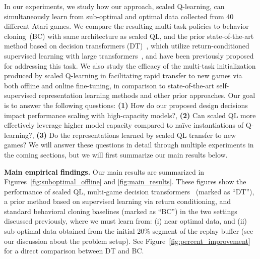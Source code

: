 In our experiments, we study how our approach, scaled Q-learning, can simultaneously learn from sub-optimal and optimal data collected from 40 different Atari games. 
We compare the resulting multi-task policies to behavior cloning~(BC) with same architecture as scaled QL, and the prior state-of-the-art method based on decision transformers (DT)~\citep{chen2021decision}, which utilize return-conditioned supervised learning with large transformers~\citep{lee2022multi}, and have been previously proposed for addressing this task. 
We also study the efficacy of the multi-task initialization produced by scaled Q-learning in facilitating rapid transfer to new games via both offline and online fine-tuning, in comparison to state-of-the-art self-supervised representation learning methods and other prior approaches. Our goal is to answer the following questions: \textbf{(1)} How do our proposed design decisions impact performance scaling with high-capacity models?, \textbf{(2)} Can scaled QL more effectively leverage higher model capacity compared to na\"ive instantiations of Q-learning?, \textbf{(3)} Do the representations learned by scaled QL transfer to new games? We will answer these questions in detail through multiple experiments in the coming sections, but we will first summarize our main results below.


\textbf{Main empirical findings.} Our main results are summarized in Figures~\ref{fig:suboptimal_offline} and \ref{fig:main_results}. These figures show the performance of scaled QL, multi-game decision transformers~\citep{lee2022multi} (marked as ``DT''), a prior method based on supervised learning via return conditioning, and standard behavioral cloning baselines (marked as ``BC'') in the two settings discussed previously, where we must learn from: (i) near optimal data, and (ii) sub-optimal data obtained from the initial 20\% segment of the replay buffer (see our discussion about the problem setup). See Figure~\ref{fig:percent_improvement} for a direct comparison between DT and BC.


